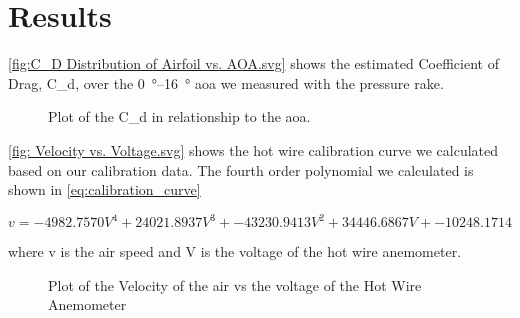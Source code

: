 \chapter{Results}
\label{cp:results}

\autoref{fig:C_D Distribution of Airfoil vs. AOA.svg} shows the estimated Coefficient of Drag, \gls{C_d}, over the \qtyrange{0}{16}{\degree} \acrshort{aoa} we measured with the pressure rake.

\begin{figure}[htpb]
    \centering
    
    \caption[Plot of the \gls{C_d} in relationship to the \acrshort{aoa}.]{Plot of the \gls{C_d} in relationship to the \acrshort{aoa}.}
    \label{fig:C_D Distribution of Airfoil vs. AOA.svg}
\end{figure}

\autoref{fig: Velocity vs. Voltage.svg} shows the hot wire calibration curve we calculated based on our calibration data. The fourth order polynomial we calculated is shown in \autoref{eq:calibration_curve}

\begin{equation} \label{eq:calibration_curve}
    v = -4982.7570V^4 + 24021.8937V^3 + -43230.9413V^2 + 34446.6867V + -10248.1714
\end{equation}

\noindent where \gls{v} is the air speed and \gls{V} is the voltage of the hot wire anemometer.

\begin{figure}[htpb]
    \centering
    
    \caption[Plot of the Velocity of the air vs the voltage of the  Hot Wire Anemometer]{Plot of the Velocity of the air vs the voltage of the  Hot Wire Anemometer}
    \label{fig: Velocity vs. Voltage.svg}
    \vspace*{4in}
\end{figure}